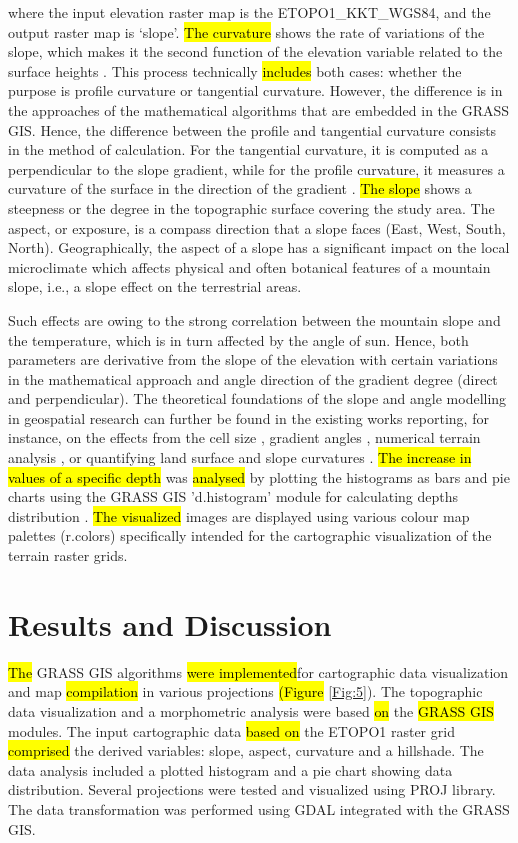 \documentclass[technologies,article,submit,pdftex,moreauthors]{Definitions/mdpi}
\begin{document}
where the input elevation raster map is the ETOPO1\_KKT\_WGS84, and the output raster map is ‘slope’. \hl{The curvature} shows the rate of variations of the slope, which makes it the second function of the elevation variable related to the surface heights \cite{Schmidt}. This process\hl{ }technically \hl{includes} both cases: whether the purpose is profile curvature or tangential curvature. However, the difference is in the approaches of the mathematical algorithms that are embedded in the GRASS GIS. Hence, the difference between the profile and tangential curvature consists in the method of calculation. For the tangential curvature, it is computed as a perpendicular to the slope gradient, while for the profile curvature, it measures a curvature of the surface in the direction of the gradient \cite{Gallant}. \hl{The slope} shows a steepness or the degree in the topographic surface covering the study area. The aspect, or exposure, is a compass direction that a slope faces (East, West, South, North). Geographically, the aspect of a slope has a significant impact on the local microclimate which affects physical and often botanical features of a mountain slope, i.e., a slope effect on the terrestrial areas. 

Such effects are owing to the strong correlation between the mountain slope and the temperature, which is in turn affected by the angle of sun. Hence, both parameters are derivative from the slope of the elevation with certain variations in the mathematical approach and angle direction of the gradient degree (direct and perpendicular). The theoretical foundations of the slope and angle modelling in geospatial research can further be found in the existing works reporting, for instance, on the effects from the cell size \cite{Hodgson1995}, gradient angles \cite{Hodgson1998}, numerical terrain analysis \cite{Zevenbegen}, or quantifying land surface and slope curvatures \cite{Dikau,Dunn,Guth,Heerdegan}. \hl{The increase in values of a specific depth} was \hl{analysed} by plotting the histograms as bars and pie charts using the GRASS GIS 'd.histogram' module for calculating depths distribution \cite{Mitasovaetal1995}. \hl{The visualized }images are displayed using various colour map palettes (r.colors) specifically intended for the cartographic visualization of the terrain raster grids. 

\section{Results and Discussion}
\hl{The} GRASS GIS algorithms \hl{were implemented}for cartographic data visualization and map\hl{ compilation} in various projections \hl{(Figure} \ref{Fig:5}). The topographic data visualization and a morphometric analysis were based \hl{on} the \hl{GRASS GIS} modules. The input cartographic data \hl{based on} the ETOPO1 raster grid \hl{comprised} the derived variables: slope, aspect, curvature and a hillshade. The data analysis included a plotted histogram and a pie chart showing data distribution. Several projections were tested and visualized using PROJ library. The data transformation was performed using GDAL integrated with the GRASS GIS. 
\end{document}
